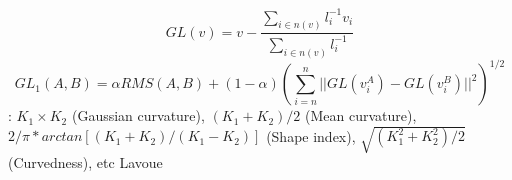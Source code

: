 \begin{equation}
GL(v)= v-\frac{\sum_{i \in n(v)}{l_i^{-1}v_i}}{\sum_{i \in n(v)}{l_i^{-1}}}
\end{equation}
\begin{equation}
GL_1(A,B)= \alpha RMS(A,B) + (1- \alpha)(\sum_{i=n}^n{||GL(v_i^A)-GL(v_i^B)||^2})^{1/2}
\end{equation}
: $ K_1 \times K_2$ (Gaussian curvature), $ (K_1+ K_2)/2$ (Mean curvature), $2/\pi *arctan[(K_1+ K_2)/( K_1- K_2)]$ (Shape index), $\sqrt{ (K_1^2+ K_2^2)/2}$ (Curvedness), etc
Lavou\’e 